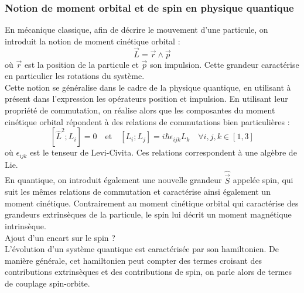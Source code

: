 \documentclass[a4paper,11pt]{article} %
\begin{document}
	\subsubsection{Notion de moment orbital et de spin en physique quantique}
	
	
	En mécanique classique, afin de décrire le mouvement d'une particule, on introduit la notion de moment cinétique orbital :
	\begin{equation*}
		\vec{L} = \vec{r} \wedge \vec{p}
	\end{equation*}
	où $\vec{r}$ est la position de la particule et $\vec{p}$ son impulsion. Cette grandeur caractérise en particulier les rotations du système.\\ 
	
	Cette notion se généralise dans le cadre de la physique quantique, en utilisant à présent dans l'expression les opérateurs position et impulsion. En utilisant leur propriété de commutation, on réalise alors que les composantes du moment cinétique orbital répondent à des relations de commutations bien particulières :
	\begin{equation*}
		\left[ \hat{L}^2 ; L_i \right] = 0 \quad \text{et} \quad \left[ L_i ; L_j \right] = i \hbar \epsilon_{ijk} L_k \quad \forall i,j,k \in [1,3]
	\end{equation*}
	où $\epsilon_{ijk}$ est le tenseur de Levi-Civita. Ces relations correspondent à une algèbre de Lie.\\
	
	En quantique, on introduit également une nouvelle grandeur $\hat{\vec{S}}$ appelée spin, qui suit les mêmes relations de commutation et caractérise ainsi également un moment cinétique. Contrairement au moment cinétique orbital qui caractérise des grandeurs extrinsèques de la particule, le spin lui décrit un moment magnétique intrinsèque.\\
	
	{\color{gray} Ajout d'un encart sur le spin ?}\\
	
	L'évolution d'un système quantique est caractérisée par son hamiltonien. De manière générale, cet hamiltonien peut compter des termes croisant des contributions extrinsèques et des contributions de spin, on parle alors de termes de couplage spin-orbite.
	
\end{document}
